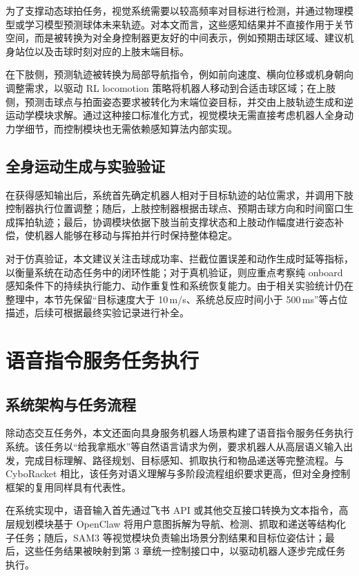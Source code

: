 为了支撑动态球拍任务，视觉系统需要以较高频率对目标进行检测，并通过物理模型或学习模型预测球体未来轨迹。对本文而言，这些感知结果并不直接作用于关节空间，而是被转换为对全身控制器更友好的中间表示，例如预期击球区域、建议机身站位以及击球时刻对应的上肢末端目标。

在下肢侧，预测轨迹被转换为局部导航指令，例如前向速度、横向位移或机身朝向调整需求，以驱动 RL locomotion 策略将机器人移动到合适击球区域；在上肢侧，预测击球点与拍面姿态要求被转化为末端位姿目标，并交由上肢轨迹生成和逆运动学模块求解。通过这种接口标准化方式，视觉模块无需直接考虑机器人全身动力学细节，而控制模块也无需依赖感知算法内部实现。

\subsection{全身运动生成与实验验证}

在获得感知输出后，系统首先确定机器人相对于目标轨迹的站位需求，并调用下肢控制器执行位置调整；随后，上肢控制器根据击球点、预期击球方向和时间窗口生成挥拍轨迹；最后，协调模块依据下肢当前支撑状态和上肢动作幅度进行姿态补偿，使机器人能够在移动与挥拍并行时保持整体稳定。

对于仿真验证，本文建议关注击球成功率、拦截位置误差和动作生成时延等指标，以衡量系统在动态任务中的闭环性能；对于真机验证，则应重点考察纯 onboard 感知条件下的持续执行能力、动作重复性和系统恢复能力。由于相关实验统计仍在整理中，本节先保留“目标速度大于 10\,m/s、系统总反应时间小于 500\,ms”等占位描述，后续可根据最终实验记录进行补全。

\section{语音指令服务任务执行}

\subsection{系统架构与任务流程}

除动态交互任务外，本文还面向具身服务机器人场景构建了语音指令服务任务执行系统。该任务以“给我拿瓶水”等自然语言请求为例，要求机器人从高层语义输入出发，完成目标理解、路径规划、目标感知、抓取执行和物品递送等完整流程。与 CyboRacket 相比，该任务对语义理解与多阶段流程组织要求更高，但对全身控制框架的复用同样具有代表性。

在系统实现中，语音输入首先通过飞书 API 或其他交互接口转换为文本指令，高层规划模块基于 OpenClaw 将用户意图拆解为导航、检测、抓取和递送等结构化子任务；随后，SAM3 等视觉模块负责输出场景分割结果和目标位姿估计；最后，这些任务结果被映射到第 3 章统一控制接口中，以驱动机器人逐步完成任务执行。

